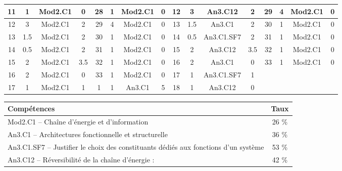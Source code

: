 \begin{center}
\begin{tabular}{|c|c|c|c||c|c|c|c||c|c|c|c||c|c|c|c|}
11 & 1 & Mod2.C1 & 0 & 28 & 1 & Mod2.C1 & 0 & 12 & 3 & An3.C12 & 2 & 29 & 4 & Mod2.C1 & 0 \\ \hline 
12 & 3 & Mod2.C1 & 2 & 29 & 4 & Mod2.C1 & 0 & 13 & 1.5 & An3.C1 & 2 & 30 & 1 & Mod2.C1 & 0 \\ \hline 
13 & 1.5 & Mod2.C1 & 2 & 30 & 1 & Mod2.C1 & 0 & 14 & 0.5 & An3.C1.SF7 & 2 & 31 & 1 & Mod2.C1 & 0 \\ \hline 
14 & 0.5 & Mod2.C1 & 2 & 31 & 1 & Mod2.C1 & 0 & 15 & 2 & An3.C12 & 3.5 & 32 & 1 & Mod2.C1 & 0 \\ \hline 
15 & 2 & Mod2.C1 & 3.5 & 32 & 1 & Mod2.C1 & 0 & 16 & 2 & An3.C1 & 0 & 33 & 1 & Mod2.C1 & 0 \\ \hline 
16 & 2 & Mod2.C1 & 0 & 33 & 1 & Mod2.C1 & 0 & 17 & 1 & An3.C1.SF7 & 1 &  &  &  &  \\ \hline 

17 & 1 & Mod2.C1 & 1 & 1 & 1 & An3.C1 & 5 & 18 & 1 & An3.C12 & 0 &  &  &  &  \\ \hline 

\end{tabular} 
\end{center} 
\normalsize 
 
\footnotesize 
\begin{center} 
\begin{tabular}{|p{.7\linewidth}|c|} 
\hline 
Compétences  & Taux \\ \hline \hline 
Mod2.C1 -- Chaîne d’énergie et d'information&26 \% \\ \hline 
An3.C1 -- Architectures fonctionnelle et structurelle &36 \% \\ \hline 
An3.C1.SF7 -- Justifier le choix des constituants dédiés aux fonctions d’un système&53 \% \\ \hline 
An3.C12 -- Réversibilité de la chaîne d’énergie :&42 \% \\ \hline 
\end{tabular} 
\end{center} 
\normalsize 
 
